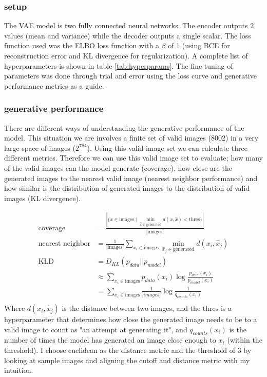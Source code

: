 \documentclass[conference,a4paper]{IEEEtran}
\begin{document}
\subsubsection{setup}

The VAE model is two fully connected neural networks. The encoder outputs 2 values (mean and variance) while the decoder outputs a single scalar. The loss function used was the ELBO loss function with a $\beta$ of 1 (using BCE for reconstruction error and KL divergence for regularization). A complete list of hyperparameters is shown in table \ref{tab:hyperparams}. The fine tuning of parameters was done through trial and error using the loss curve and generative performance metrics as a guide.
\subsubsection{generative performance}


There are different ways of understanding the generative performance of the model. This situation we are involves a finite set of valid images (8002) in a very large space of images ($2^{784}$). Using this valid image set we can calculate three different metrics.
Therefore we can use this valid image set to evaluate; how many of the valid images can the model generate (coverage), how close are the generated images to the nearest valid image (nearest neighbor performance) and how similar is the distribution of generated images to the distribution of valid images (KL divergence).

\begin{align*}
\text{coverage} &= \frac{|\{x \in \text{images} \mid \min_{\hat{x} \in \text{generated}} d(x, \hat{x}) < \text{thres}\}|}{|\text{images}|}\\
\text{nearest neighbor} &= \frac{1}{|\text{images}|} \sum_{x_i \in \text{images}} \min_{\hat{x}_j \in \text{generated}} d(x_i, \hat{x}_j)\\
\text{KLD} &= D_{KL}(p_{data} || p_{model})\\
&\approx \sum_{x_i \in \text{images}} p_{data}(x_i) \log \frac{p_{data}(x_i)}{p_{model}(x_i)}\\
&= \sum_{x_i \in \text{images}} \frac{1}{|images|} \log \frac{1}{q_{counts}(x_i)}\\
\end{align*}
Where $d(x_i, \hat{x}_j)$ is the distance between two images, and the $\text{thres}$ is a hyperparameter that determines how close the generated image needs to be to a valid image to count as "an attempt at generating it", and $q_{counts}(x_i)$ is the number of times the model has generated an image close enough to $x_i$ (within the threshold). I choose euclidean as the distance metric and the threshold of 3 by looking at sample images and aligning the cutoff and distance metric with my intuition.
\end{document}
